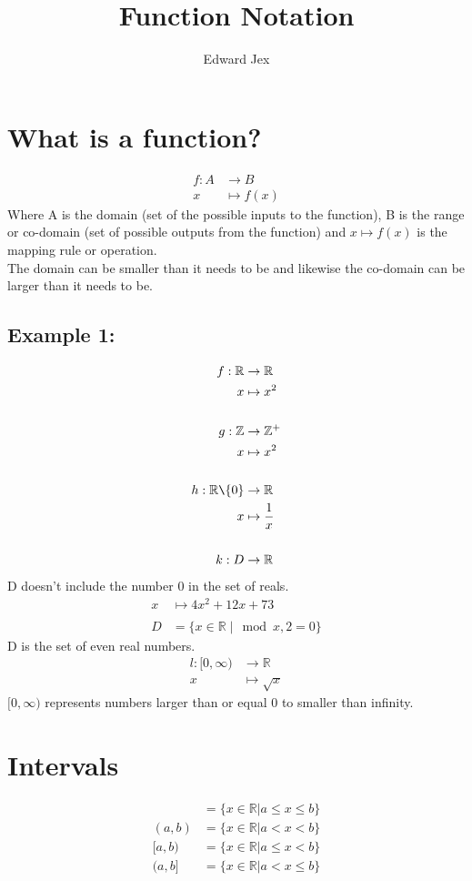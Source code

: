 \documentclass[a4paper,12pt]{article}
\begin{document}
\title{Function Notation}	
\author{Edward Jex}
\maketitle
\section*{What is a function?}
\begin{align*}
f: A & \rightarrow B \\
x & \mapsto f(x)
\end{align*}
Where A is the domain (set of the possible inputs to the function), B is the range or co-domain (set of possible outputs from the function) and $x \mapsto f(x)$ is the mapping rule or operation. \\
The domain can be smaller than it needs to be and likewise the co-domain can be larger than it needs to be. 
\subsection*{Example 1:}
\begin{align*}
f: \mathbb{R} & \rightarrow \mathbb{R} \\
x & \mapsto x^2 \\\\
g: \mathbb{Z} & \rightarrow \mathbb{Z}^+ \\
x & \mapsto x^2 \\\\
h: \mathbb{R} \texttt{\char`\\} \{0\} & \rightarrow \mathbb{R} \\
x & \mapsto \frac{1}{x} \\\\
k: D & \rightarrow \mathbb{R} \\
\end{align*}
D doesn't include the number 0 in the set of reals.
\begin{align*}
x & \mapsto 4x^2 + 12x + 73 \\\\
D & = \{x \in \mathbb{R} \; \vert \mod{x,2} = 0 \}
\end{align*}
D is the set of even real numbers. 
\begin{align*}
l: [0,\infty) & \rightarrow \mathbb{R} \\
x & \mapsto \sqrt{x} 
\end{align*}
$[0,\infty)$ represents numbers larger than or equal 0 to smaller than infinity.
\section*{Intervals}
\begin{align*}
[a,b] & = \{ x \in \mathbb{R} \vert a \leqslant x \leqslant b \} \\
(a,b) & = \{ x \in \mathbb{R} \vert a < x < b \} \\
[a,b) & = \{ x \in \mathbb{R} \vert a \leqslant x < b \} \\
(a,b] & = \{ x \in \mathbb{R} \vert a < x \leqslant b \} \\
\end{align*}
\end{document}
